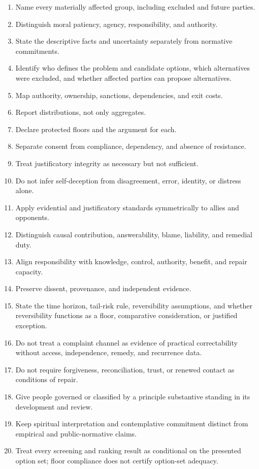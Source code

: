 \documentclass[
  11pt,
]{article}
\providecommand{\tightlist}{%
  \setlength{\itemsep}{0pt}\setlength{\parskip}{0pt}}
\begin{document}
\begin{enumerate}
\def\labelenumi{\arabic{enumi}.}
\tightlist
\item
  Name every materially affected group, including excluded and future
  parties.
\item
  Distinguish moral patiency, agency, responsibility, and authority.
\item
  State the descriptive facts and uncertainty separately from normative
  commitments.
\item
  Identify who defines the problem and candidate options, which
  alternatives were excluded, and whether affected parties can propose
  alternatives.
\item
  Map authority, ownership, sanctions, dependencies, and exit costs.
\item
  Report distributions, not only aggregates.
\item
  Declare protected floors and the argument for each.
\item
  Separate consent from compliance, dependency, and absence of
  resistance.
\item
  Treat justificatory integrity as necessary but not sufficient.
\item
  Do not infer self-deception from disagreement, error, identity, or
  distress alone.
\item
  Apply evidential and justificatory standards symmetrically to allies
  and opponents.
\item
  Distinguish causal contribution, answerability, blame, liability, and
  remedial duty.
\item
  Align responsibility with knowledge, control, authority, benefit, and
  repair capacity.
\item
  Preserve dissent, provenance, and independent evidence.
\item
  State the time horizon, tail-risk rule, reversibility assumptions, and
  whether reversibility functions as a floor, comparative consideration,
  or justified exception.
\item
  Do not treat a complaint channel as evidence of practical
  correctability without access, independence, remedy, and recurrence
  data.
\item
  Do not require forgiveness, reconciliation, trust, or renewed contact
  as conditions of repair.
\item
  Give people governed or classified by a principle substantive standing
  in its development and review.
\item
  Keep spiritual interpretation and contemplative commitment distinct
  from empirical and public-normative claims.
\item
  Treat every screening and ranking result as conditional on the
  presented option set; floor compliance does not certify option-set
  adequacy.
\end{enumerate}
\end{document}
